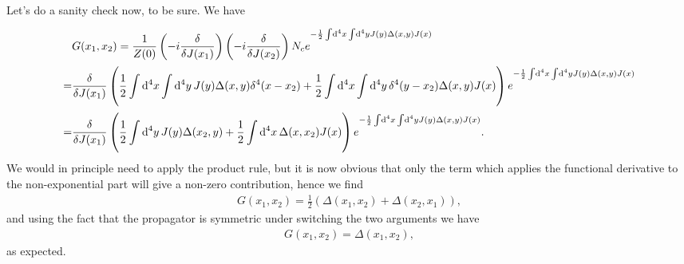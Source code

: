 Let's do a sanity check now, to be sure. We have
\begin{align*}
	&G(x_{1}, x_{2}) = \frac{1}{Z(0)}\left(-i\fdv{J(x_{1})}\right)\left(-i\fdv{J(x_{2})}\right)N_{c}e^{-\frac{1}{2}\integ[4]{}{}{x}{\integ[4]{}{}{y}{J(y)\Delta(x, y)J(x)}}} \\
	                =& \fdv{J(x_{1})}\left(\frac{1}{2}\integ[4]{}{}{x}{\integ[4]{}{}{y}{J(y)\Delta(x, y)\delta^{4}(x - x_{2})}} + \frac{1}{2}\integ[4]{}{}{x}{\integ[4]{}{}{y}{\delta^{4}(y - x_{2})\Delta(x, y)J(x)}}\right)e^{-\frac{1}{2}\integ[4]{}{}{x}{\integ[4]{}{}{y}{J(y)\Delta(x, y)J(x)}}} \\
	                =& \fdv{J(x_{1})}\left(\frac{1}{2}\integ[4]{}{}{y}{J(y)\Delta(x_{2}, y)} + \frac{1}{2}\integ[4]{}{}{x}{\Delta(x, x_{2})J(x)}\right)e^{-\frac{1}{2}\integ[4]{}{}{x}{\integ[4]{}{}{y}{J(y)\Delta(x, y)J(x)}}}.
\end{align*}
We would in principle need to apply the product rule, but it is now obvious that only the term which applies the functional derivative to the non-exponential part will give a non-zero contribution, hence we find
\begin{align*}
	G(x_{1}, x_{2}) = \frac{1}{2}(\Delta(x_{1}, x_{2}) + \Delta(x_{2}, x_{1})),
\end{align*}
and using the fact that the propagator is symmetric under switching the two arguments we have
\begin{align*}
	G(x_{1}, x_{2}) = \Delta(x_{1}, x_{2}),
\end{align*}
as expected.

